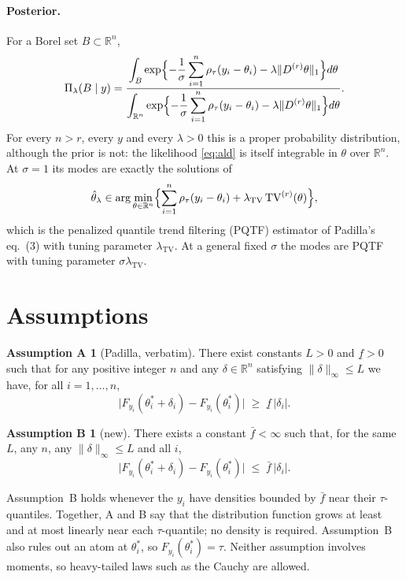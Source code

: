 \documentclass[11pt]{article}
\theoremstyle{definition}
\newtheorem*{assumptionA}{Assumption A}
\newtheorem*{assumptionB}{Assumption B}
\theoremstyle{remark}
\newcommand{\R}{\mathbb{R}}
\newcommand{\TV}{\mathrm{TV}}
\newcommand{\Dr}{D^{(r)}}
\newcommand{\lamtv}{\lambda_{\TV}}
\newcommand{\thetas}{\theta^{*}}
\begin{document}
\paragraph{Posterior.} For a Borel set $B\subset\R^n$,
\begin{equation}\label{eq:post}
\Pi_\lambda(B\mid y)=\frac{\displaystyle\int_B\exp\Bigl\{-\frac{1}{\sigma}\sum_{i=1}^n\rho_\tau(y_i-\theta_i)-\lambda\|\Dr\theta\|_1\Bigr\}d\theta}
{\displaystyle\int_{\R^n}\exp\Bigl\{-\frac{1}{\sigma}\sum_{i=1}^n\rho_\tau(y_i-\theta_i)-\lambda\|\Dr\theta\|_1\Bigr\}d\theta}.
\end{equation}
For every $n>r$, every $y$ and every $\lambda>0$ this is a proper probability distribution, although the prior is not: the likelihood \eqref{eq:ald} is itself integrable in $\theta$ over $\R^n$. At $\sigma=1$ its modes are exactly the solutions of
\begin{equation}\label{eq:mode}
\hat\theta_\lambda\in\arg\min_{\theta\in\R^n}\Bigl\{\sum_{i=1}^n\rho_\tau(y_i-\theta_i)+\lamtv\,\TV^{(r)}(\theta)\Bigr\},
\end{equation}
which is the penalized quantile trend filtering (PQTF) estimator of Padilla's eq.~(3) with tuning parameter $\lamtv$. At a general fixed $\sigma$ the modes are PQTF with tuning parameter $\sigma\lamtv$.

\section{Assumptions}

\begin{assumptionA}[Padilla, verbatim]
There exist constants $L>0$ and $\underline f>0$ such that for any positive integer $n$ and any $\delta\in\R^n$ satisfying $\|\delta\|_\infty\le L$ we have, for all $i=1,\dots,n$,
\[
\bigl|F_{y_i}(\thetas_i+\delta_i)-F_{y_i}(\thetas_i)\bigr|\;\ge\;\underline f\,|\delta_i| .
\]
\end{assumptionA}

\begin{assumptionB}[new]
There exists a constant $\bar f<\infty$ such that, for the same $L$, any $n$, any $\|\delta\|_\infty\le L$ and all $i$,
\[
\bigl|F_{y_i}(\thetas_i+\delta_i)-F_{y_i}(\thetas_i)\bigr|\;\le\;\bar f\,|\delta_i| .
\]
\end{assumptionB}

Assumption~B holds whenever the $y_i$ have densities bounded by $\bar f$ near their $\tau$-quantiles. Together, A and B say that the distribution function grows at least and at most linearly near each $\tau$-quantile; no density is required. Assumption~B also rules out an atom at $\thetas_i$, so $F_{y_i}(\thetas_i)=\tau$. Neither assumption involves moments, so heavy-tailed laws such as the Cauchy are allowed.
\end{document}
